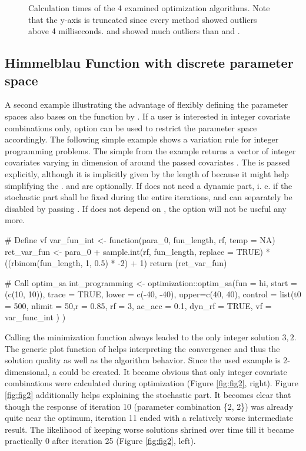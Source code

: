 \begin{figure}[htbp]
	\centering
	\resizebox{.6\linewidth}{!}{}
	\caption{Calculation times of the 4 examined optimization algorithms. Note that the y-axis is truncated since every method showed outliers above 4 milliseconds.  and  showed much outliers than  and .}
	\label{fig:fig1}
\end{figure}

\subsection{Himmelblau Function with discrete parameter space}
A second example illustrating the advantage of flexibly defining the parameter spaces also bases on the function by \citet{himmelblau_1972}. If a user is interested in integer covariate combinations only,  option can be used to restrict the parameter space accordingly. The following simple example shows a variation rule for integer programming problems. The simple  from the example returns a vector of integer covariates varying in dimension of  around the passed covariates . The  is passed explicitly, although it is implicitly given by the length of  because it might help simplifying the .  and  are optionally. If  does not need a dynamic part, i. e. if the stochastic part shall be fixed during the entire iterations,  and  can separately be disabled by passing . If  does not depend on , the option  will not be useful any more.

\begin{example}
# Define vf
var_fun_int <- function(para_0, fun_length, rf, temp = NA){
	ret_var_fun <- para_0 + sample.int(rf, fun_length, replace = TRUE) *
	((rbinom(fun_length, 1, 0.5) * -2) + 1)
	return (ret_var_fun)
}

# Call optim_sa
int_programming <- optimization::optim_sa(fun = hi, start = (c(10, 10)), trace = TRUE, 
	lower = c(-40, -40), upper=c(40, 40),
	control = list(t0 = 500, nlimit = 50,r = 0.85, rf = 3, ac_acc = 0.1,
		dyn_rf = TRUE, vf = var_func_int
		)
	)
\end{example}

Calling the minimization function always leaded to the only integer solution ${3, 2}$. The generic plot function of  helps interpreting the convergence and thus the solution quality as well as the algorithm behavior. Since the used example is 2-dimensional, a  could be created. It became obvious that only integer covariate combinations were calculated during optimization (Figure \ref{fig:fig2}, right). Figure \ref{fig:fig2} additionally helps explaining the stochastic part. It becomes clear that though the response of iteration 10 (parameter combination \{2, 2\}) was already quite near the optimum, iteration 11 ended with a relatively worse intermediate result. The likelihood of keeping worse solutions shrined over time till it became practically 0 after iteration 25 (Figure \ref{fig:fig2}, left).

